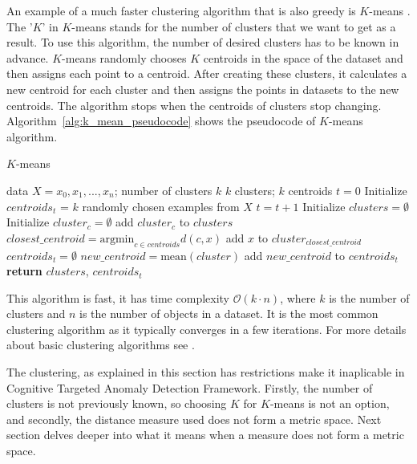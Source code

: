 \documentclass[thesis=B,english]{FITthesis}[2012/10/20]
\begin{document}
An example of a much faster clustering algorithm that is also greedy is $K$-means \cite{guttag2016introduction}.
The '$K$' in $K$-means stands for the number of clusters that we want to get as a result.
To use this algorithm, the number of desired clusters has to be known in advance.
$K$-means randomly chooses $K$ centroids in the space of the dataset and then assigns each point to a centroid.
After creating these clusters, it calculates a new centroid for each cluster and then assigns the points in datasets to the new centroids.
The algorithm stops when the centroids of clusters stop changing.
Algorithm~\ref{alg:k_mean_pseudocode} shows the pseudocode of $K$-means algorithm.

\begin{algorithm}[t]
    \caption{$K$-means}
    \label{alg:k_mean_pseudocode}
    \begin{algorithmic}[1]
        \INPUT data $X = x_0, x_1, ..., x_n$; number of clusters $k$
        \OUTPUT $k$ clusters; $k$ centroids
        \STATE $t = 0$
        \STATE Initialize $centroids_t$ = $k$ randomly chosen examples from $X$
        \DO
            \STATE $t = t + 1$
            \STATE Initialize $clusters = \emptyset$
                \STATE Initialize $cluster_c = \emptyset$
                \STATE add $cluster_c$ to $clusters$
            \ENDFOR
                \STATE $closest\_centroid = \mathrm{argmin}_{c \in centroids} d(c, x)$
                \STATE add $x$ to $cluster_{closest\_centroid}$
            \ENDFOR
            \STATE $centroids_t = \emptyset$
                \STATE $new\_centroid  = \mathrm{mean}(cluster)$
                \STATE add $new\_centroid$ to $centroids_t$
            \ENDFOR
        \STATE \textbf{return} $clusters$, $centroids_t$

    \end{algorithmic}
\end{algorithm}

This algorithm is fast, it has time complexity $\mathcal{O}(k \cdot n)$, where $k$ is the  number of clusters and $n$ is the number of objects in a dataset.
It is the most common clustering algorithm as it typically converges in a few iterations.
For more details about basic clustering algorithms see \cite{guttag2016introduction}.

The clustering, as explained in this section has restrictions make it inaplicable in Cognitive Targeted Anomaly Detection Framework.
Firstly, the number of clusters is not previously known, so choosing $K$ for $K$-means is not an option, and secondly, the distance measure used does not form a metric space.
Next section delves deeper into what it means when a measure does not form a metric space.
\end{document}
